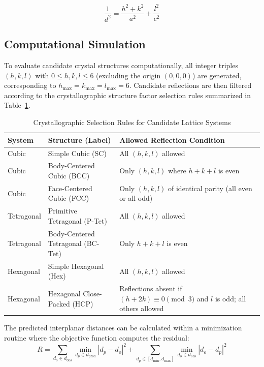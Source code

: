 \documentclass[12pt]{article}
\begin{document}
\begin{equation}
    \tag{Tetragonal}
    \label{eq:Tetragonal}
    \frac{1}{d^2} = \frac{h^2+k^2}{a^2}+\frac{l^2}{c^2}
\end{equation}


\subsection{Computational Simulation}
To evaluate candidate crystal structures computationally, all integer triples $(h, k, l)$ with $0 \le h, k, l \le 6$ (excluding the origin $(0, 0, 0)$) are generated, corresponding to $h_{\max} = k_{\max} = l_{\max} = 6$. Candidate reflections are then filtered according to the crystallographic structure factor selection rules summarized in Table~\ref{tab:selection_rules}.

\begin{table}[ht]
    \centering
    \caption{Crystallographic Selection Rules for Candidate Lattice Systems}
    \label{tab:selection_rules}
    \begin{tabular}{ll>{\raggedright\arraybackslash}p{6.2cm}}
        \toprule
        \textbf{System} & \textbf{Structure (Label)} & \textbf{Allowed Reflection Condition} \\
        \midrule
        Cubic & Simple Cubic (SC) & All $(h, k, l)$ allowed \\
        Cubic & Body-Centered Cubic (BCC) & Only $(h, k, l)$ where $h + k + l$ is even \\
        Cubic & Face-Centered Cubic (FCC) & Only $(h, k, l)$ of identical parity (all even or all odd) \\
        Tetragonal & Primitive Tetragonal (P-Tet) & All $(h, k, l)$ allowed \\
        Tetragonal & Body-Centered Tetragonal (BC-Tet) & Only $h + k + l$ is even \\
        Hexagonal & Simple Hexagonal (Hex) & All $(h, k, l)$ allowed \\
        Hexagonal & Hexagonal Close-Packed (HCP) & Reflections absent if $(h + 2k) \equiv 0 \pmod 3$ and $l$ is odd; all others allowed \\
        \bottomrule
    \end{tabular}
\end{table}

The predicted interplanar distances can be calculated within a minimization routine where the 
objective function computes the residual:
\begin{equation}
R = \sum_{d_o \in d_{\text{obs}}} \min_{d_p \in d_{\text{pred}}} |d_p - d_o|^2  + \sum_{d_p \in [d_{\min}, d_{\max}]} \min_{d_o \in d_{\text{obs}}} |d_o - d_p|^2
\end{equation}
\end{document}
